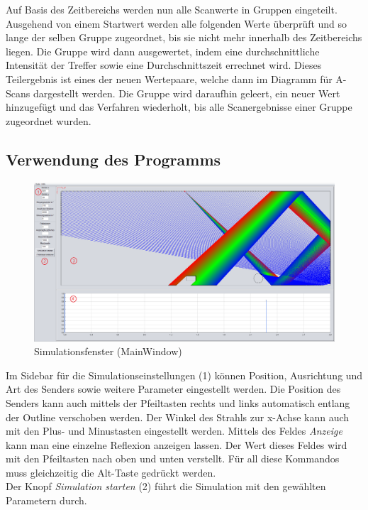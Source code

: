 \documentclass[reducespace,stylepage,semiarbeit]{spezidoc}
\begin{document}
Auf Basis des Zeitbereichs werden nun alle Scanwerte in Gruppen eingeteilt. 
Ausgehend von einem Startwert werden alle folgenden Werte überprüft und so lange der selben Gruppe zugeordnet, bis sie nicht mehr innerhalb des Zeitbereichs liegen. 
Die Gruppe wird dann ausgewertet, indem eine durchschnittliche Intensität der Treffer sowie eine Durch\-schnitts\-zeit errechnet wird. %
Dieses Teilergebnis ist eines der neuen Wertepaare, welche dann im Diagramm für A-Scans dargestellt werden. 
Die Gruppe wird daraufhin geleert, ein neuer Wert hinzugefügt und das Verfahren wiederholt, bis alle Scanergebnisse einer Gruppe zugeordnet wurden.


\subsection{Verwendung des Programms} %
\begin{figure}[h]
\centering
\includegraphics[scale=0.315]{pictures/MainWindow.png}
\caption{Simulationsfenster (MainWindow)}
\end{figure}
Im Sidebar für die Simulationseinstellungen (1) können Position, Ausrichtung und Art des Senders sowie weitere Parameter eingestellt werden. 
Die Position des Senders kann auch mittels der Pfeiltasten rechts und links automatisch entlang der Outline verschoben werden. 
Der Winkel des Strahls zur x-Achse kann auch mit den Plus- und Minustasten eingestellt werden. 
Mittels des Feldes \textit{Anzeige} kann man eine einzelne Reflexion anzeigen lassen. 
Der Wert dieses Feldes wird mit den Pfeiltasten nach oben und unten verstellt. 
Für all diese Kommandos muss gleichzeitig die Alt-Taste gedrückt werden.\\
Der Knopf \textit{Simulation starten} (2) führt die Simulation mit den gewählten Parametern durch. 
\end{document}

